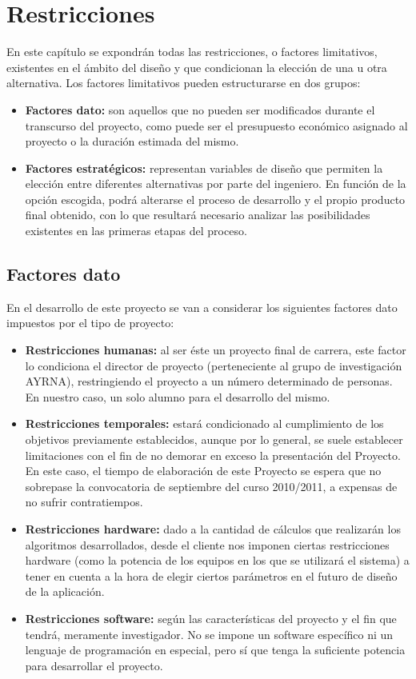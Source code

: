 \chapter{Restricciones}
	
	En este capítulo se expondrán todas las restricciones, o factores limitativos, existentes en el ámbito del diseño y que condicionan la elección de una u otra alternativa. Los factores limitativos pueden estructurarse en dos grupos:
	
	\begin{itemize}
		\item \textbf{Factores dato:} son aquellos que no pueden ser modificados durante el transcurso del proyecto, como puede ser el presupuesto económico asignado al proyecto o la duración estimada del mismo.
		\item \textbf{Factores estratégicos:} representan variables de diseño que permiten la elección entre diferentes alternativas por parte del ingeniero. En función de la opción escogida, podrá alterarse el proceso de desarrollo y el propio producto final obtenido, con lo que resultará necesario analizar las posibilidades existentes en las primeras etapas del proceso.
	\end{itemize}
	
	\section{Factores dato}
	
		En el desarrollo de este proyecto se van a considerar los siguientes factores dato impuestos por el tipo de proyecto:
	
		\begin{itemize}
			\item \textbf{Restricciones humanas:} al ser éste un proyecto final de carrera, este factor lo condiciona el director de proyecto (perteneciente al grupo de investigación AYRNA), restringiendo el proyecto a un número determinado de personas. En nuestro caso, un solo alumno para el desarrollo del mismo.
			\item \textbf{Restricciones temporales:} estará condicionado al cumplimiento de los objetivos previamente establecidos, aunque por lo general, se suele establecer limitaciones con el fin de no demorar en exceso la presentación del Proyecto. En este caso, el tiempo de elaboración de este Proyecto se espera que no sobrepase la convocatoria de septiembre del curso 2010/2011, a expensas de no sufrir contratiempos.
			\item \textbf{Restricciones hardware:} dado a la cantidad de cálculos que realizarán los algoritmos desarrollados, desde el cliente nos imponen ciertas restricciones hardware (como la potencia de los equipos en los que se utilizará el sistema) a tener en cuenta a la hora de elegir ciertos parámetros en el futuro de diseño de la aplicación.
			\item \textbf{Restricciones software:} según las características del proyecto y el fin que tendrá, meramente investigador. No se impone un software específico ni un lenguaje de programación en especial, pero sí que tenga la suficiente potencia para desarrollar el proyecto.
		\end{itemize}
		
